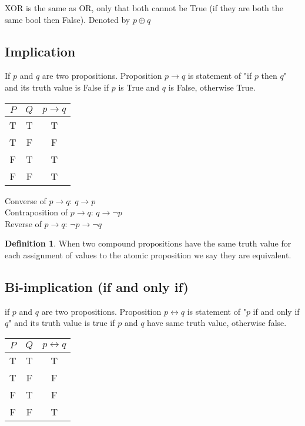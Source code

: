 \documentclass[11pt]{article}
\theoremstyle{definition}
\newtheorem{defn}{Definition}
\begin{document}
XOR is the same as OR, only that both cannot be True (if they are both the same bool then False). Denoted by $p \oplus q$

\subsection{Implication}
If $p$ and $q$ are two propositions. Proposition $p \rightarrow q$ is statement of "if $p$ then $q$" and its truth value is False if $p$ is True and $q$ is False, otherwise True.
\begin{center}
	\begin{tabular}{ |c|c|c|} 
 		\hline
 		$P$ & $Q$ & $p \rightarrow q$  \\
		\hline
 		T & T  & T \\
 		T & F & F \\
		F & T & T \\
		F & F & T \\
 		\hline
	\end{tabular}
\end{center}
Converse of $p \rightarrow q$: $q \rightarrow p$ \\
Contraposition of $p \rightarrow q$: $q \rightarrow \neg p$ \\
Reverse of $p \rightarrow q$: $\neg p \rightarrow \neg q$

\begin{defn}
When two compound propositions have the same truth value for each assignment of values to the atomic proposition we say they are equivalent. 
\end{defn}
\subsection{Bi-implication (if and only if)}
if $p$ and $q$ are two propositions. Proposition $p \longleftrightarrow q$ is statement of "$p$ if and only if$q$" and its truth value is true if $p$ and $q$ have same truth value, otherwise false. 
\begin{center}
	\begin{tabular}{ |c|c|c|} 
 		\hline
 		$P$ & $Q$ & $p \longleftrightarrow q$  \\
		\hline
 		T & T  & T \\
 		T & F & F \\
		F & T & F \\
		F & F & T \\
 		\hline
	\end{tabular}
\end{center}
\end{document}
